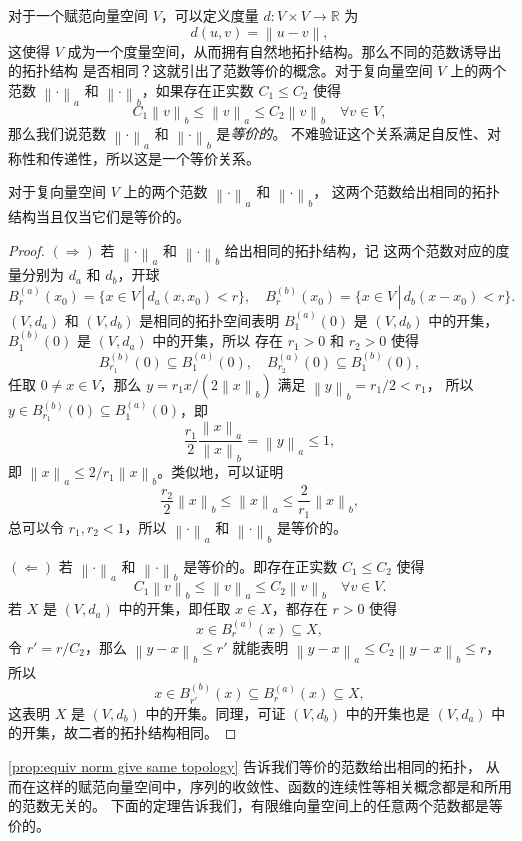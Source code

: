 \documentclass[fontset=none,zihao=-4]{Notes}
\newcommand{\norm}[1]{\left\lVert#1\right\rVert}
\begin{document}
对于一个赋范向量空间 $V$，可以定义度量 $d:V\times V\to\mathbb{R}$ 为
\[
  d(u,v)=\norm{u-v},
\]
这使得 $V$ 成为一个度量空间，从而拥有自然地拓扑结构。那么不同的范数诱导出的拓扑结构
是否相同？这就引出了范数等价的概念。对于复向量空间 $V$ 上的两个范数 $\norm{\cdot}_a$
和 $\norm{\cdot}_b$，如果存在正实数 $C_1\leq C_2$ 使得
\[
  C_1\norm{v}_b\leq \norm{v}_a\leq C_2\norm{v}_b\quad \forall v\in V,  
\]
那么我们说范数 $\norm{\cdot}_a$ 和 $\norm{\cdot}_b$ 是\emph{等价的}。
不难验证这个关系满足自反性、对称性和传递性，所以这是一个等价关系。

\begin{proposition}\label{prop:equiv norm give same topology}
  对于复向量空间 $V$ 上的两个范数 $\norm{\cdot}_a$ 和 $\norm{\cdot}_b$，
  这两个范数给出相同的拓扑结构当且仅当它们是等价的。
\end{proposition}
\begin{proof}
  $(\Rightarrow)$ 若 $\norm{\cdot}_a$ 和 $\norm{\cdot}_b$ 给出相同的拓扑结构，记
  这两个范数对应的度量分别为 $d_a$ 和 $d_b$，开球
  \[
    B_r^{(a)}(x_0)=\{x\in V\,|\, d_a(x,x_0)< r\},\quad
    B_r^{(b)}(x_0)=\{x\in V\,|\, d_b(x-x_0)< r\}.
  \]
  $(V,d_a)$ 和 $(V,d_b)$ 是相同的拓扑空间表明
  $B_1^{(a)}(0)$ 是 $(V,d_b)$ 中的开集，$B_1^{(b)}(0)$ 是 $(V,d_a)$ 中的开集，所以
  存在 $r_1>0$ 和 $r_2>0$ 使得
  \[
    B_{r_1}^{(b)}(0)\subseteq B_1^{(a)}(0),\quad B_{r_2}^{(a)}(0)\subseteq B_1^{(b)}(0),
  \]
  任取 $0\neq x\in V$，那么 $y=r_1x/(2\norm{x}_b)$ 满足 $\norm{y}_b=r_1/2<r_1$，
  所以 $y\in B_{r_1}^{(b)}(0)\subseteq B_1^{(a)}(0)$，即
  \[
    \frac{r_1}{2}\frac{\norm{x}_a}{\norm{x}_b}=\norm{y}_a \leq 1,
  \]
  即 $\norm{x}_a\leq 2/r_1 \norm{x}_b$。类似地，可以证明
  \[
    \frac{r_2}{2}\norm{x}_b\le \norm{x}_a\leq \frac{2}{r_1}\norm{x}_b,  
  \]
  总可以令 $r_1,r_2<1$，所以 $\norm{\cdot}_a$ 和 $\norm{\cdot}_b$ 是等价的。

  $(\Leftarrow)$ 若 $\norm{\cdot}_a$ 和 $\norm{\cdot}_b$ 是等价的。即存在正实数 $C_1\leq C_2$ 使得
  \[
    C_1\norm{v}_b\leq \norm{v}_a\leq C_2\norm{v}_b\quad \forall v\in V.
  \]
  若 $X$ 是 $(V,d_a)$ 中的开集，即任取 $x\in X$，都存在 $r>0$ 使得
  \[
    x\in B_r^{(a)}(x)\subseteq X,  
  \]
  令 $r'=r/C_2$，那么
  $\norm{y-x}_b\leq r'$ 就能表明 $\norm{y-x}_a\leq C_2\norm{y-x}_b\leq r$，所以
  \[
    x\in B_{r'}^{(b)}(x)\subseteq   B_r^{(a)}(x)\subseteq X,
  \]
  这表明 $X$ 是 $(V,d_b)$ 中的开集。同理，可证 $(V,d_b)$ 中的开集也是 $(V,d_a)$
  中的开集，故二者的拓扑结构相同。
\end{proof}

\autoref{prop:equiv norm give same topology} 告诉我们等价的范数给出相同的拓扑，
从而在这样的赋范向量空间中，序列的收敛性、函数的连续性等相关概念都是和所用的范数无关的。
下面的定理告诉我们，有限维向量空间上的任意两个范数都是等价的。
\end{document}
